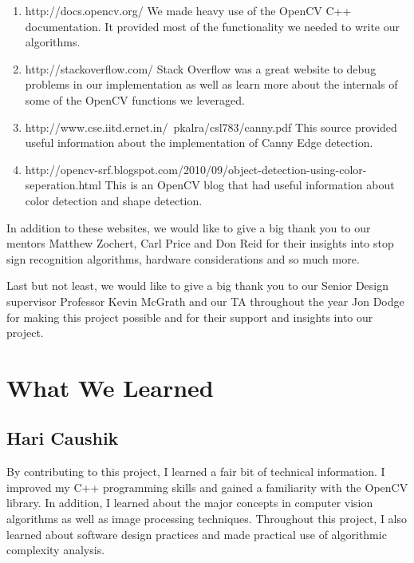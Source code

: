 \documentclass[letterpaper,10pt,titlepage]{article}
\begin{document}
\begin{enumerate}
    \item http://docs.opencv.org/
    We made heavy use of the OpenCV C++ documentation. It provided most of the
    functionality we needed to write our algorithms.
    \item http://stackoverflow.com/
    Stack Overflow was a great website to debug problems in our implementation
    as well as learn more about the internals of some of the OpenCV functions
    we leveraged.
    \item http://www.cse.iitd.ernet.in/~pkalra/csl783/canny.pdf
    This source provided useful information about the implementation of Canny
    Edge detection.
    \item http://opencv-srf.blogspot.com/2010/09/object-detection-using-color-seperation.html
    This is an OpenCV blog that had useful information about color detection
    and shape detection.
\end{enumerate}

In addition to these websites, we would like to give a big thank you to our 
mentors Matthew Zochert, Carl Price and Don Reid for their insights into 
stop sign recognition algorithms, hardware considerations and so much more. 

Last but not least, we would like to give a big thank you to our Senior Design
supervisor Professor Kevin McGrath and our TA throughout the year Jon Dodge for
making this project possible and for their support and insights into our 
project. 

\section*{What We Learned}
\subsection*{Hari Caushik}
By contributing to this project, I learned a fair bit of technical information. 
I improved my C++ programming skills and gained a familiarity with the OpenCV
library. In addition, I learned about the major concepts in computer vision
algorithms as well as image processing techniques. Throughout this project, I
also learned about software design practices and made practical use of
algorithmic complexity analysis.
\end{document}
